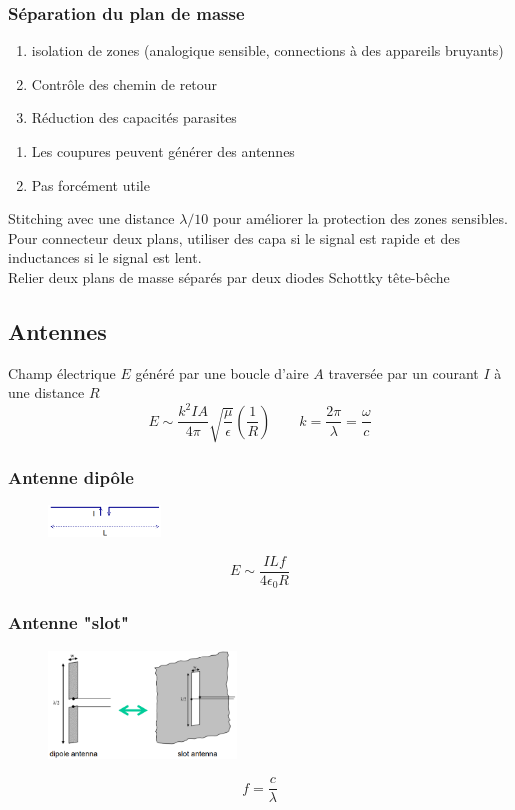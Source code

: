 \documentclass[resume]{subfiles}
\begin{document}
\begin{multicols}{3}
\subsubsection{Séparation du plan de masse}
\begin{multicols}{2}
\begin{enumerate}[label={+}]
\item isolation de zones (analogique sensible, connections à des appareils bruyants)
\item Contrôle des chemin de retour 
\item Réduction des capacités parasites
\end{enumerate}
\begin{enumerate}[label={-}]
\item Les coupures peuvent générer des antennes
\item Pas forcément utile
\end{enumerate}
\end{multicols}
Stitching avec une distance $\lambda/10$ pour améliorer la protection des zones sensibles.\\
Pour connecteur deux plans, utiliser des capa si le signal est rapide et des inductances si le signal est lent.\\
Relier deux plans de masse séparés par deux diodes Schottky tête-bêche
\subsection{Antennes}
Champ électrique $E$ généré par une boucle d'aire $A$ traversée par un courant $I$ à une distance $R$
$$E\sim \frac{k^2 IA}{4\pi}\sqrt{\frac{\mu}{\epsilon}}\left(\frac{1}{R}\right)\qquad k=\frac{2\pi}{\lambda}=\frac{\omega}{c}$$
\subsubsection{Antenne dipôle}
\begin{figure}[H]
\centering
\includegraphics[width=3.00cm]{img_5.png}
\end{figure}
$$E\sim \frac{ILf}{4\epsilon_0 R}$$
\subsubsection{Antenne "slot"}
\begin{figure}[H]
\centering
\includegraphics[width=5.00cm]{img_6.png}
\end{figure}
$$f=\frac{c}{\lambda}$$

\end{multicols}
\end{document}

